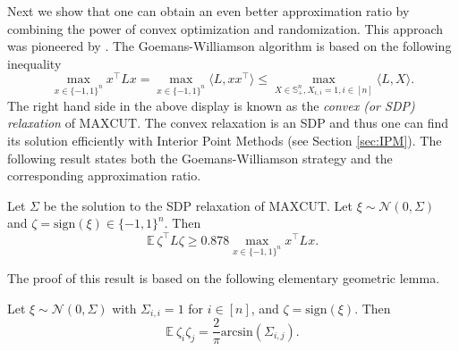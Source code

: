\documentclass[openany]{now}
\newcommand{\E}{\mathbb{E}}
\newcommand{\cN}{\mathcal{N}}
\begin{document}
Next we show that one can obtain an even better approximation ratio by combining the power of convex optimization and randomization. This approach was pioneered by \cite{GW95}. The Goemans-Williamson algorithm is based on the following inequality
$$\max_{x \in \{-1,1\}^n} x^{\top} L x = \max_{x \in \{-1,1\}^n} \langle L, xx^{\top} \rangle \leq \max_{X \in \mathbb{S}_+^n, X_{i,i}=1, i \in [n]} \langle L, X \rangle .$$ 
The right hand side in the above display is known as the {\em convex (or SDP) relaxation} of $\mathrm{MAXCUT}$. The convex relaxation is an SDP and thus one can find its solution efficiently with Interior Point Methods (see Section \ref{sec:IPM}). The following result states both the Goemans-Williamson strategy and the corresponding approximation ratio.

\begin{theorem} \label{th:GW}
Let $\Sigma$ be the solution to the SDP relaxation of $\mathrm{MAXCUT}$. Let $\xi \sim \cN(0, \Sigma)$ and $\zeta = \mathrm{sign}(\xi) \in \{-1,1\}^n$. Then
$$\E \ \zeta^{\top} L \zeta \geq 0.878 \max_{x \in \{-1,1\}^n} x^{\top} L x .$$
\end{theorem}

The proof of this result is based on the following elementary geometric lemma.

\begin{lemma} \label{lem:GW}
Let $\xi \sim \mathcal{N}(0,\Sigma)$ with $\Sigma_{i,i}=1$ for $i \in [n]$, and $\zeta = \mathrm{sign}(\xi)$. Then
$$\E \ \zeta_i \zeta_j = \frac{2}{\pi} \mathrm{arcsin} \left(\Sigma_{i,j}\right) .$$
\end{lemma}
\end{document}
